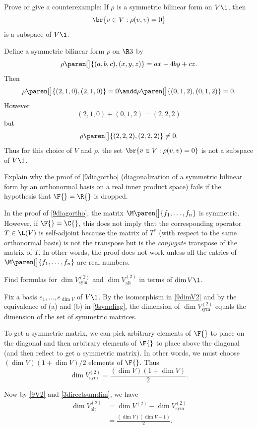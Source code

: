 \exercise
Prove or give a counterexample: If $\rho$ is a symmetric bilinear form on $V\1$, then
\[
\br{v \in V: \rho(v, v) = 0}
\]
is a subspace of $V\1$.

\begin{Solution}
Define a symmetric bilinear form $\rho$ on $\R3$ by
\[
\rho\paren[\big]{(a,b,c), (x,y,z) } = ax - 4by + cz.
\]
Then
\[
\rho\paren[\big]{(2,1,0),(2,1,0) } = 0 \andd \rho\paren[\big]{(0,1,2),(0,1,2)} = 0.
\]
However
\[
(2,1,0)  + (0, 1,2) = (2,2,2)
\]
but
\[
\rho\paren[\big]{(2,2,2), (2,2,2)} \ne 0.
\]
Thus for this choice of $V$ and $\rho$, the set $\br{v \in V: \rho(v, v) = 0}$ is not a subspace of $V\1$.
\end{Solution}

\exercise
Explain why the proof of \ref{9diagortho} (diagonalization of a symmetric bilinear form by an orthonormal basis on a real inner product space) fails if the hypothesis that $\F{} = \R{}$ is dropped.

\begin{Solution}
In the proof of \ref{9diagortho}, the matrix $\M\paren[\big]{ f_1, \ldots, f_n }$ is symmetric. However, if $\F{} = \C{}$, this does not imply that the corresponding operator $T \in \L(V)$ is self-adjoint because the matrix of $T^*$ (with respect to the same orthonormal basis) is not the transpose but is the \emph{conjugate} transpose of the matrix of $T$. In other words, the proof does not work unless all the entries of $\M\paren[\big]{ f_1, \ldots, f_n }$ are real numbers.
\end{Solution}

\exercise
Find formulas for $\dim V^{(2)}_{\text{sym}}$ and $\dim V^{(2)}_{\text{alt}}$ in terms of $\dim V\1$.

\begin{Solution}
Fix a basis $e_1, \ldots, e_{\dim V}$ of $V\1$. By the isomorphism in \ref{9dimV2} and by the equivalence of (a) and (b) in \ref{9symdiag}, the dimension of $\dim V^{(2)}_{\text{sym}}$ equals the dimension of the set of symmetric  matrices.

To get a symmetric  matrix, we can pick arbitrary elements of $\F{}$ to place on the diagonal and then arbitrary elements of $\F{}$ to place above the diagonal (and then reflect to get a symmetric matrix). In other words, we must choose $(\dim V)(1 + \dim V)/2$ elements of $\F{}$. Thus
\[
\dim V^{(2)}_{\text{sym}} = \frac{ (\dim V)(1 + \dim V) }{2}.
\]

Now by \ref{9V2} and \ref{3directsumdim}, we have
\begin{align*}
\dim V^{(2)}_{\text{alt}} &= \dim V^{(2)} - \dim V^{(2)}_{\text{sym}} \\[6bp]
&= \frac{ (\dim V)(\dim V - 1) }{2}.
\end{align*}
\end{Solution}

